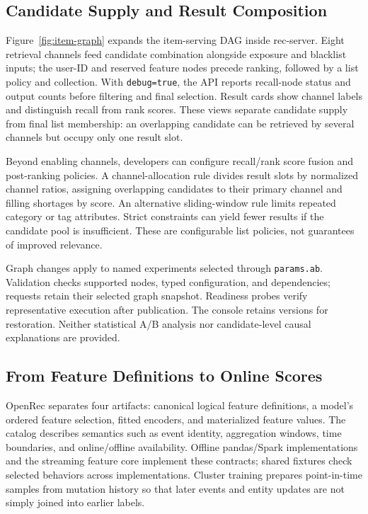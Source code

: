\documentclass[sigconf,screen,review]{acmart}
\begin{document}
\subsection{Candidate Supply and Result Composition}
Figure~\ref{fig:item-graph} expands the item-serving DAG inside rec-server. Eight retrieval channels feed candidate combination alongside exposure and blacklist inputs; the user-ID and reserved feature nodes precede ranking, followed by a list policy and collection. With \texttt{debug=true}, the API reports recall-node status and output counts before filtering and final selection. Result cards show channel labels and distinguish recall from rank scores. These views separate candidate supply from final list membership: an overlapping candidate can be retrieved by several channels but occupy only one result slot.

Beyond enabling channels, developers can configure recall/rank score fusion and post-ranking policies. A channel-allocation rule divides result slots by normalized channel ratios, assigning overlapping candidates to their primary channel and filling shortages by score. An alternative sliding-window rule limits repeated category or tag attributes. Strict constraints can yield fewer results if the candidate pool is insufficient. These are configurable list policies, not guarantees of improved relevance.

Graph changes apply to named experiments selected through \texttt{params.ab}. Validation checks supported nodes, typed configuration, and dependencies; requests retain their selected graph snapshot. Readiness probes verify representative execution after publication. The console retains versions for restoration. Neither statistical A/B analysis nor candidate-level causal explanations are provided.

\subsection{From Feature Definitions to Online Scores}
OpenRec separates four artifacts: canonical logical feature definitions, a model's ordered feature selection, fitted encoders, and materialized feature values. The catalog describes semantics such as event identity, aggregation windows, time boundaries, and online/offline availability. Offline pandas/Spark implementations and the streaming feature core implement these contracts; shared fixtures check selected behaviors across implementations. Cluster training prepares point-in-time samples from mutation history so that later events and entity updates are not simply joined into earlier labels.
\end{document}
